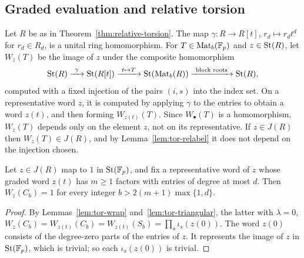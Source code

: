 \subsection{Graded evaluation and relative torsion}

Let $R$ be as in Theorem~\ref{thm:relative-torsion}. The map $\gamma\colon R\to R[t]$, $r_d\mapsto r_dt^d$ for
$r_d\in R_d$, is a unital ring homomorphism. For $T\in\operatorname{Mat}_b(\mathbb F_p)$ and $z\in\operatorname{St}(R)$, let $W_z(T)$ be the image of $z$
under the composite homomorphism
\[
 \St(R)\xrightarrow{\ \gamma\ }\St(R[t])\xrightarrow{\ t\mapsto T\ }\St(\grpMat_b(R))\xrightarrow{\ \text{block roots}\ }\St(R),
\]
computed with a fixed injection of the pairs $(i,s)$ into the index set. On a representative word $z$, it is computed by
applying $\gamma$ to the entries to obtain a word $z(t)$, and then forming $W_{z(t)}(T)$. Since $W_\bullet(T)$ is a
homomorphism, $W_z(T)$ depends only on the element $z$, not on its representative. If $z\in J(R)$ then
$W_z(T)\in J(R)$, and by Lemma~\ref{lem:tor-relabel} it does not depend on the injection chosen.

\begin{lemma}\label{lem:tor-vanishing}
Let $z\in J(R)$ map to $1$ in $\operatorname{St}(\mathbb F_p)$, and fix a representative word of $z$ whose graded word $z(t)$ has $m\geq1$
factors with entries of degree at most $d$. Then $W_z(C_b)=1$ for every integer $b>2(m+1)\max\{1,d\}$.
\end{lemma}

\begin{proof}
By Lemmas~\ref{lem:tor-wrap} and~\ref{lem:tor-triangular}, the latter with $\lambda=0$,
$W_z(C_b)=W_{z(t)}(C_b)=W_{z(t)}(S_b)=\prod_s\iota_s(z(0))$. The word $z(0)$ consists of the degree-zero parts of the entries of $z$. It
represents the image of $z$ in $\operatorname{St}(\mathbb F_p)$, which is trivial; so each $\iota_s(z(0))$ is trivial.
\end{proof}

